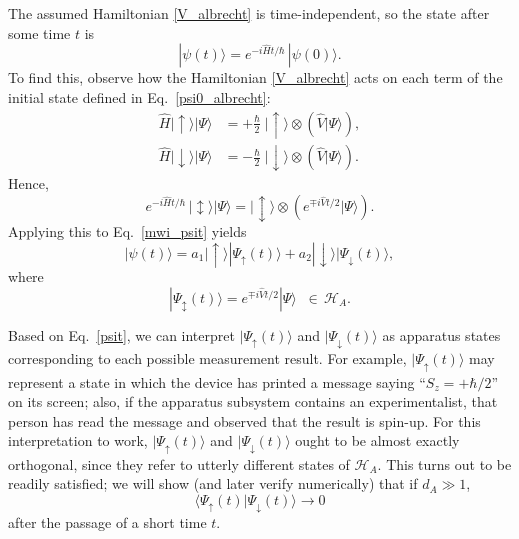 \documentclass[prx,12pt]{revtex4-2}
\begin{document}
The assumed Hamiltonian \eqref{V_albrecht} is time-independent, so the
state after some time $t$ is
\begin{equation}
  |\psi(t)\rangle = e^{-i\hat{H}t/\hbar}\, |\psi(0)\rangle.
  \label{mwi_psit}
\end{equation}
To find this, observe how the Hamiltonian \eqref{V_albrecht} acts on
each term of the initial state defined in Eq.~\eqref{psi0_albrecht}:
\begin{align}
  \hat{H} |\!\uparrow\rangle |\Psi\rangle
  &= + \frac{\hbar}{2}\;
  |\!\uparrow\rangle \otimes \left(\hat{V} |\Psi\rangle\right), \\
  \hat{H} |\!\downarrow\rangle |\Psi\rangle
  &= - \frac{\hbar}{2}\;
  |\!\downarrow\rangle \otimes \left( \hat{V} |\Psi\rangle\right).
\end{align}
Hence,
\begin{equation}
  e^{-i\hat{H}t/\hbar}\, 
  |\!\updownarrow\rangle |\Psi\rangle
  = |\!\updownarrow\rangle \otimes
  \left(e^{\mp i\hat{V}t/2} |\Psi\rangle\right).
\end{equation}
Applying this to Eq.~\eqref{mwi_psit} yields
\begin{equation}
  |\psi(t)\rangle =
  a_1 |\!\uparrow\rangle |\Psi_\uparrow(t)\rangle + a_2 |\!\downarrow\rangle  |\Psi_\downarrow(t)\rangle,
  \label{psit}
\end{equation}
where
\begin{equation}
  |\Psi_{\updownarrow} (t)\rangle = e^{\mp i\hat{V}t/2} |\Psi\rangle
  \;\;\in\, \mathscr{H}_A.
\end{equation}

Based on Eq.~\eqref{psit}, we can interpret $|\Psi_\uparrow(t)\rangle$
and $|\Psi_\downarrow(t)\rangle$ as apparatus states corresponding to
each possible measurement result.  For example,
$|\Psi_\uparrow(t)\rangle$ may represent a state in which the device
has printed a message saying ``$S_z = + \hbar/2$'' on its screen;
also, if the apparatus subsystem contains an experimentalist, that
person has read the message and observed that the result is spin-up.
For this interpretation to work, $|\Psi_\uparrow(t)\rangle$ and
$|\Psi_\downarrow(t)\rangle$ ought to be almost exactly orthogonal,
since they refer to utterly different states of $\mathscr{H}_A$.  This
turns out to be readily satisfied; we will show (and later verify
numerically) that if $d_A \gg 1$,
\begin{equation}
  \langle\Psi_\uparrow(t) | \Psi_\downarrow(t)\rangle \rightarrow 0
  \label{overlapzero}
\end{equation}
after the passage of a short time $t$.
\end{document}
